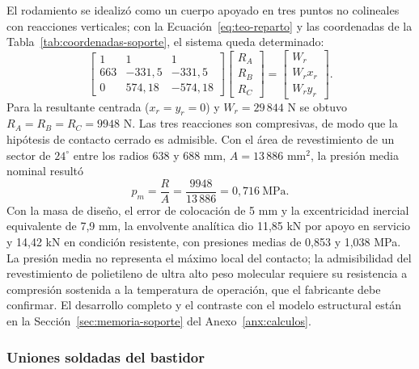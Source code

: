 El rodamiento se idealizó como un cuerpo apoyado en tres puntos no colineales con reacciones verticales; con la Ecuación~\eqref{eq:teo-reparto} y las coordenadas de la Tabla~\ref{tab:coordenadas-soporte}, el sistema queda determinado:
\begin{equation}
\begin{bmatrix}
1&1&1\\
663&-331{,}5&-331{,}5\\
0&574{,}18&-574{,}18
\end{bmatrix}
\begin{bmatrix}R_A\\R_B\\R_C\end{bmatrix}
=
\begin{bmatrix}W_r\\W_r x_r\\W_r y_r\end{bmatrix}.
\label{eq:dis-reparto-pad}
\end{equation}
Para la resultante centrada ($x_r=y_r=0$) y $W_r=29\,844$ N se obtuvo $R_A=R_B=R_C=9948$ N. Las tres reacciones son compresivas, de modo que la hipótesis de contacto cerrado es admisible. Con el área de revestimiento de un sector de $24^\circ$ entre los radios 638 y 688 mm, $A=13\,886$ mm$^2$, la presión media nominal resultó
\begin{equation}
p_m=\frac{R}{A}=\frac{9948}{13\,886}=0{,}716\ \mathrm{MPa}.
\label{eq:dis-presion-pad}
\end{equation}
Con la masa de diseño, el error de colocación de 5 mm y la excentricidad inercial equivalente de 7,9 mm, la envolvente analítica dio 11,85 kN por apoyo en servicio y 14,42 kN en condición resistente, con presiones medias de 0,853 y 1,038 MPa. La presión media no representa el máximo local del contacto; la admisibilidad del revestimiento de polietileno de ultra alto peso molecular requiere su resistencia a compresión sostenida a la temperatura de operación, que el fabricante debe confirmar. El desarrollo completo y el contraste con el modelo estructural están en la Sección~\ref{sec:memoria-soporte} del Anexo~\ref{anx:calculos}.

\subsubsection{Uniones soldadas del bastidor}
\label{sec:uniones-bastidor}

